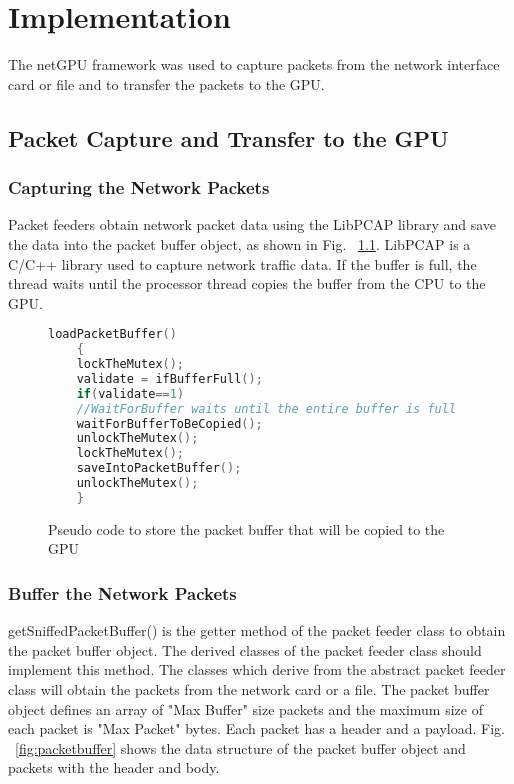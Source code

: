
\chapter{Implementation}

The netGPU \cite{bib3} framework was used to capture packets from the network interface card or file and to transfer the packets to the GPU.

\section{Packet Capture and Transfer to the GPU}
\vspace{\topsep}
\subsection{Capturing the Network Packets}
Packet feeders obtain network packet data using the LibPCAP library and save the data into the packet buffer object, as shown in Fig. ~\ref{fig:packetfeeder}. LibPCAP \cite{bib4} is a C/C++ library used to capture network traffic data. If the buffer is full, the thread waits until the processor thread copies the buffer from the CPU to the GPU. 

\begin{figure}[H]
	\centering
	\begin{lstlisting}[frame=none,language=C++] 
	loadPacketBuffer()
	{
	lockTheMutex();
	validate = ifBufferFull();
	if(validate==1)
	//WaitForBuffer waits until the entire buffer is full
	waitForBufferToBeCopied();
	unlockTheMutex();
	lockTheMutex();
	saveIntoPacketBuffer();
	unlockTheMutex();
	}
	\end{lstlisting}
	\caption{Pseudo code to store the packet buffer that will be copied to the GPU}
	\label{fig:packetfeeder}
\end{figure}
\squeezeup
\subsection{Buffer the Network Packets}
getSniffedPacketBuffer() is the getter method of the packet feeder class to obtain the packet buffer object. The derived classes of the packet feeder class should implement this method. The classes which derive from the abstract packet feeder class will obtain the packets from the network card or a file. The packet buffer object defines an array of "Max Buffer" size packets and the maximum size of each packet is "Max Packet" bytes. Each packet has a header and a payload. Fig. ~\ref{fig:packetbuffer} shows the data structure of the packet buffer object and  packets with the header and body.

